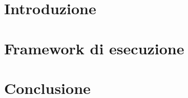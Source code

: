 \documentclass[a4paper,12pt,draft]{article}
\begin{document}


\begingroup
	\hypersetup{linkcolor=black}
	\setcounter{tocdepth}{2}
	\tableofcontents
\endgroup

\newpage

\section{Introduzione}


\cite{lmvTabu}
\cite{lmvTspack}
\section{Framework di esecuzione}


\section{Conclusione}



{}


\end{document}
